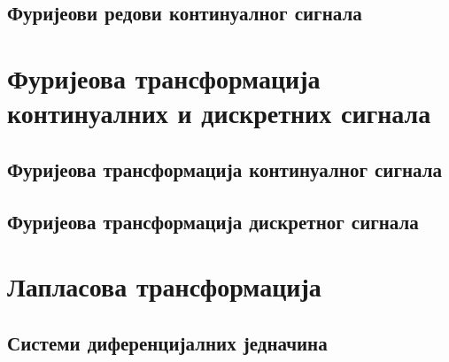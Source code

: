 \subsection{Фуријеови редови континуалног сигнала}

\setcounter{fid}{0}
\graphicspath{{./2_furijeovi_redovi/1_kontinualni/}}
\noindent

\vspace*{\ProblemSep}

\setcounter{fid}{0}
\graphicspath{{./2_furijeovi_redovi/1_kontinualni/}}
\noindent

\vspace*{\ProblemSep}

\setcounter{fid}{0}
\graphicspath{{./2_furijeovi_redovi/1_kontinualni/}}
\noindent

\vspace*{\ProblemSep}
\section{Фуријеова трансформација континуалних и дискретних сигнала}
\subsection{Фуријеова трансформација континуалног сигнала}

\setcounter{fid}{0}
\graphicspath{{./3_furijeove_tranformacije/1_CT/}}
\noindent

\vspace*{\ProblemSep}
\subsection{Фуријеова трансформација дискретног сигнала}
\section{Лапласова трансформација}
\subsection{Системи диференцијалних једначина}

\setcounter{fid}{0}
\graphicspath{{./4_laplasova_transformacija/2_sistemi_dif_jna/}}
\noindent

\vspace*{\ProblemSep}

